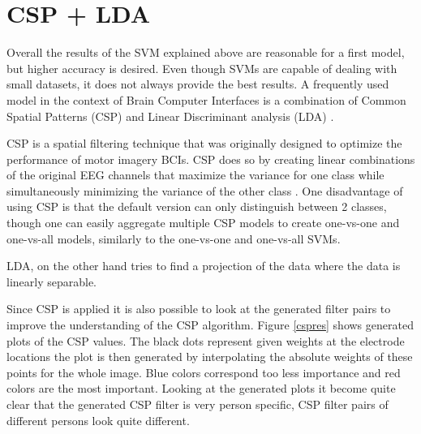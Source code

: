 \clearpage

\section{CSP + LDA}

Overall the results of the SVM explained above are reasonable for a first model, but higher accuracy is desired. Even though SVMs are capable of dealing with small datasets, it does not always provide the best results\cite{svmldacomp}. A frequently used model in the context of Brain Computer Interfaces is a combination of Common Spatial Patterns (CSP) and Linear Discriminant analysis (LDA)  \cite{ErrorPotentials,svmldacomp,currTrends}. 

\npar

CSP is a spatial filtering technique that was originally designed to optimize the performance of motor imagery BCIs. CSP does so by creating linear combinations of the original EEG channels that maximize the variance for one class while simultaneously minimizing the variance of the other class \cite{ErrorPotentials}. One disadvantage of using CSP is that the default version can only distinguish between 2 classes, though one can easily aggregate multiple CSP models to create one-vs-one and one-vs-all models, similarly to the one-vs-one and one-vs-all SVMs.

\npar 

LDA, on the other hand tries to find a projection of the data where the data is linearly separable.




Since CSP is applied it is also possible to look at the generated filter pairs to improve the understanding of the CSP algorithm. Figure \ref{cspres} shows generated plots of the CSP values. The black dots represent given weights at the electrode locations the plot is then generated by interpolating the absolute weights of these points for the whole image. Blue colors correspond too less importance and red colors are the most important. Looking at the generated plots it become quite clear that the generated CSP filter is very person specific, CSP filter pairs of different persons look quite different. 

